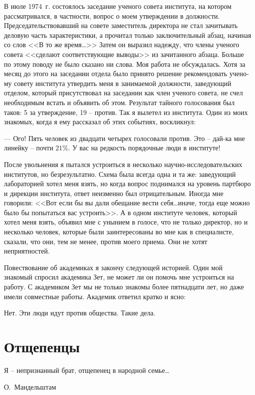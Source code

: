 \documentclass{book}
\begin{document}
В июле 1974~г. состоялось заседание ученого совета инсти­тута, на котором рассматривался, в частности, вопрос о моем утверждении в должности. Председательствовавший на совете заместитель директора не стал зачитывать деловую часть харак­теристики, а прочитал только заключительный абзац, начиная со слов <<В то же время\ldots>> Затем он выразил надежду, что члены ученого совета <<сделают соответствующие выводы>> из зачи­танного абзаца. Больше по этому поводу не было сказано ни слова. Моя работа не обсуждалась. Хотя за месяц до этого на заседании отдела было принято решение рекомендовать учено­му совету института утвердить меня в занимаемой должности, заведующий отделом, который присутствовал на заседании как член ученого совета, не счел необходимым встать и объя­вить об этом. Результат тайного голосования был таков: 5 за утверждение, 19 -- против. Так я вылетел из института.
Один из моих знакомых, когда я ему рассказал об этих со­бытиях, воскликнул:

--- Ого! Пять человек из двадцати четырех голосовали про­тив. Это -- дай-ка мне линейку -- почти $21\%$. У вас на редкость порядочные люди в институте!

После увольнения я пытался устроиться в несколько науч­но-исследовательских институтов, но безрезультатно. Схема была всегда одна и та же: заведующий лабораторией хотел меня взять, но когда вопрос поднимался на уровень партбюро и дирекции института, ответ неизменно был отрицательным. Иногда мне говорили: <<Вот если бы вы дали обещание вести себя\ldots иначе, тогда еще можно было бы попытаться вас устро­ить>>. А в одном институте человек, который хотел меня взять, объявил мне с унынием в голосе, что не только директор, но и несколько человек, которые были заинтересованы во мне как в специалисте, сказали, что они, тем не менее, против моего приема. Они не хотят неприятностей.

Повествование об академиках я закончу следующей исто­рией. Один мой знакомый спросил академика Зет, не может ли он помочь мне 
устроиться на работу. С академиком Зет мы не только знакомы более пятнадцати лет, но даже имели сов­местные работы. Академик 
ответил кратко и ясно:

Нет. Эти люди идут против общества. Такие дела.


\section{Отщепенцы}
\epigraph{Я -- непризнанный брат, отщепенец в народной семье\ldots}{О.~Мандельштам}
\end{document}
